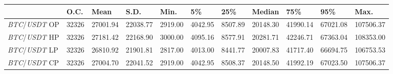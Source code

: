 \begin{tabular}{lllllllllll}
\toprule
 & \textbf{O.C.} & \textbf{Mean} & \textbf{S.D.} & \textbf{Min.} & \textbf{5\%} & \textbf{25\%} & \textbf{Median} & \textbf{75\%} & \textbf{95\%} & \textbf{Max.} \\
\midrule
\emph{BTC}/\emph{USDT} OP & 32326 & 27001.94 & 22038.77 & 2919.00 & 4042.95 & 8507.89 & 20148.30 & 41990.14 & 67021.08 & 107506.37 \\
\emph{BTC}/\emph{USDT} HP & 32326 & 27181.42 & 22168.90 & 3000.00 & 4095.16 & 8577.91 & 20281.71 & 42246.71 & 67363.04 & 108353.00 \\
\emph{BTC}/\emph{USDT} LP & 32326 & 26810.92 & 21901.81 & 2817.00 & 4013.00 & 8441.77 & 20007.83 & 41717.40 & 66694.75 & 106753.53 \\
\emph{BTC}/\emph{USDT} CP & 32326 & 27004.70 & 22041.52 & 2919.00 & 4042.95 & 8508.37 & 20148.50 & 41992.19 & 67023.50 & 107506.37 \\
\bottomrule
\end{tabular}
